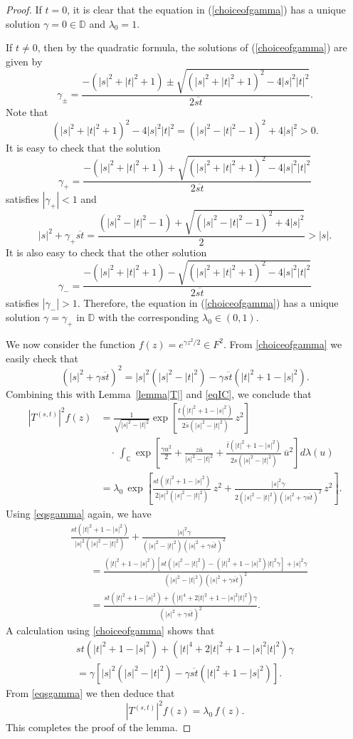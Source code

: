 \documentclass[10pt,a4paper]{amsart}
\newcommand{\C}{{\mathbb C}}
\newcommand{\D}{{\mathbb D}}
\newcommand{\inc}{\int_{\C}}
\begin{document}
\begin{proof}
If $t=0$, it is clear that the equation in (\ref{choiceofgamma})
has a unique solution $\gamma=0\in\D$ and $\lambda_0=1$.

If $t\neq0$, then by the quadratic formula, the solutions of
(\ref{choiceofgamma}) are given by
$$\gamma_{\pm}=\frac{-(|s|^2+|t|^2+1)\pm
\sqrt{(|s|^2+|t|^2+1)^2-4|s|^2|t|^2}}{2\overline{st}}.$$
Note that
$$(|s|^2+|t|^2+1)^2-4|s|^2|t|^2=(|s|^2-|t|^2-1)^2+4|s|^2>0.$$
It is easy to check that the solution
$$\gamma_+=\frac{-(|s|^2+|t|^2+1)+\sqrt{(|s|^2+|t|^2+1)^2
-4|s|^2|t|^2}}{2\overline{st}}$$
satisfies
$|\gamma_+|<1$ and
$$|s|^2+\gamma_+\overline{st}=\frac{(|s|^2-|t|^2-1)+
\sqrt{(|s|^2-|t|^2-1)^2+4|s|^2}}{2}>|s|.$$
It is also easy to check that the other solution
$$\gamma_-=\frac{-(|s|^2+|t|^2+1)-\sqrt{(|s|^2+|t|^2+1)^2
-4|s|^2|t|^2}}{2\overline{st}}$$
satisfies $|\gamma_-|>1$. Therefore, the equation in
(\ref{choiceofgamma}) has a unique solution $\gamma=\gamma_+$
in $\D$ with the corresponding $\lambda_0\in(0,1)$.

We now consider the function $f(z)=e^{\gamma z^2/2}\in F^2$.
From \eqref{choiceofgamma} we easily check that
\begin{equation}\label{eqsgamma}
\left(|s|^2+\gamma{\overline{st}}\right)^2
={|s|^2(|s|^2-|t|^2)-\gamma{\overline{st}}(|t|^2+1-|s|^2)}.
\end{equation}
Combining this with Lemma~\ref{lemma|T|} and \eqref{eqIC},
we conclude that
\begin{align*}
\left|T^{(s,t)}\right|^2 f(z)
 &=\frac{1}{\sqrt{|s|^2-|t|^2}}\exp\left[\frac{t(|t|^2+1-|s|^2)}{2\overline{s}(|s|^2-|t|^2)}\,z^2\right]\\[8pt]
&\quad\cdot\,\inc\exp\left[\frac{\gamma u^2}{2}+\frac{z\overline{u}}{{|s|^2-|t|^2}}+
\frac{\bar t(|t|^2+1-|s|^2)}{2s(|s|^2-|t|^2)}\,\overline u^2\right] d\lambda(u)\\
&=\lambda_0\,\exp\left[\frac{st(|t|^2+1-|s|^2)}
{2|s|^2(|s|^2-|t|^2)}\,z^2+\frac{|s|^2 \gamma}{2(|s|^2-|t|^2)\left(|s|^2
+\gamma{\overline{st}}\right)^2}\,z^{2}\right].
\end{align*}
Using \eqref{eqsgamma} again, we have
\begin{align*}
&\frac{st(|t|^2+1-|s|^2)}{|s|^2(|s|^2-|t|^2)}+\frac{|s|^2\gamma}
{(|s|^2-|t|^2)\left(|s|^2+\gamma{\overline{st}}\right)^2}\\
&\qquad=\frac{(|t|^2+1-|s|^2)\left[st(|s|^2-|t|^2)-(|t|^2+1-|s|^2)|t|^2
\gamma\right]+|s|^2 \gamma}{(|s|^2-|t|^2)\left(|s|^2+
\gamma{\overline{st}}\right)^2}\\
&\qquad=\frac{st(|t|^2+1-|s|^2)+\left(|t|^4+2|t|^2+1-|s|^2|t|^2\right)\gamma}{\left(|s|^2+\gamma{\overline{st}}\right)^2}.
\end{align*}
A calculation using \eqref{choiceofgamma} shows that
\begin{multline*}
st(|t|^2+1-|s|^2)+(|t|^4+2|t|^2+1-|s|^2|t|^2)\gamma\\
=\gamma\left[|s|^2(|s|^2-|t|^2)-\gamma{\overline{st}}
(|t|^2+1-|s|^2)\right].
\end{multline*}
From \eqref{eqsgamma} we then deduce that
$$\left|T^{(s,t)}\right|^2 f(z)=\lambda_0\,f(z).$$
This completes the proof of the lemma.
\end{proof}
\end{document}
